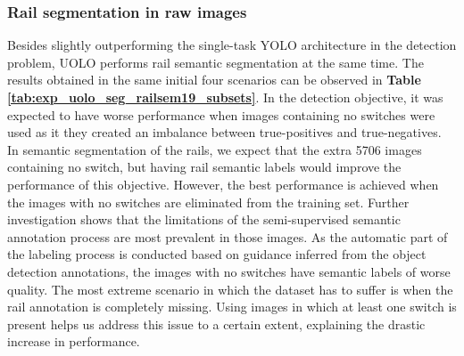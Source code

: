 \documentclass[conference]{IEEEtran}
\begin{document}
\subsubsection{Rail segmentation in raw images}

Besides slightly outperforming the single-task YOLO architecture in the detection problem, UOLO performs rail semantic segmentation at the same time. The results obtained in the same initial four scenarios can be observed in \textbf{Table \ref{tab:exp_uolo_seg_railsem19_subsets}}. In the detection objective, it was expected to have worse performance when images containing no switches were used as it 
they created an imbalance between true-positives and true-negatives. In semantic segmentation of the rails, we expect that the extra 5706 images containing no switch, but having rail semantic labels would improve the performance of this objective. However, the best performance is achieved when the images with no switches are eliminated 
from the training set. 
Further investigation shows that the limitations of the semi-supervised semantic annotation process are most prevalent in those images. As the automatic part of the labeling process is conducted based on guidance inferred from the object detection annotations, the images with no switches have semantic labels of worse quality. The most extreme scenario in which the dataset has to suffer is when the rail annotation is completely missing. Using images in which at least one switch is present helps us address this issue to a certain extent, explaining the drastic increase in performance.
\end{document}
